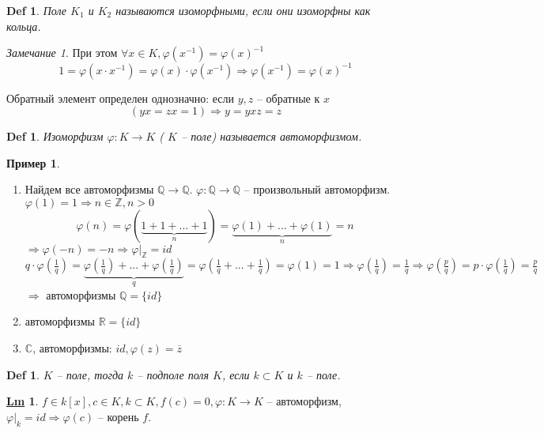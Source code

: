 \documentclass[12pt]{article}
\newenvironment{MyList}[1][4pt]{
  \begin{enumerate}[1.]
  \setlength{\parskip}{0pt}
  \setlength{\itemsep}{#1}
}{       
  \end{enumerate}
}
\def\C{\mathbb{C}}       %
\def\Q{\mathbb{Q}}       %
\def\R{\mathbb{R}}       %
\def\Z{\mathbb{Z}}       %
\def\PHI{\varphi}        %
\def\SO{\Rightarrow}     %
\theoremstyle{definition} %
\newtheorem{Lm}[Thm]{\underline{Lm}} %
\newtheorem{Example}[Thm]{Пример} %
\theoremstyle{plain} %
\newtheorem{Def}[Thm]{Def} %
\theoremstyle{remark} %
\newtheorem{Rem}[Thm]{Замечание} %
\begin{document}
{\begin{Def}
    Поле $K_1$ и $K_2$ называются изоморфными, если они изоморфны как кольца.
\end{Def}

\begin{Rem}
    При этом $\forall x \in K, \PHI(x^{-1}) = \PHI(x)^{-1}$
    $$1 = \PHI(x \cdot x^{-1}) = \PHI(x) \cdot \PHI(x^{-1}) \SO \PHI(x^{-1}) = \PHI(x)^{-1}$$

    Обратный элемент определен однозначно: если $y, z$ -- обратные к $x$ 
    \[(yx = zx = 1) \SO y = yxz = z\]
\end{Rem}

\begin{Def}
    Изоморфизм $\PHI: K \to K$ ( $K$ -- поле) называется автоморфизмом.
\end{Def}

\begin{Example}
    \begin{MyList}
        \item Найдем все автоморфизмы $\Q \to \Q$. $\PHI: \Q \to \Q$ -- произвольный автоморфизм. $\PHI(1) = 1 \SO n \in \Z, n > 0$
        \[\PHI(n) = \PHI(\underbrace{1 + 1 + ... + 1}_n) = \underbrace{\PHI(1) + ... + \PHI(1)}_n = n\]
        $\SO \PHI(-n) = -n \SO\PHI|_\Z = id$ \\
        $q \cdot \PHI \left(\frac{1}{q}\right) = \underbrace{\PHI \left(\frac{1}{q}\right) + ... + \PHI \left(\frac{1}{q}\right)}_q = \PHI\left(\frac{1}{q} + ... + \frac{1}{q}\right) = \PHI(1) = 1 \SO \PHI\left(\frac{1}{q}\right) = \frac{1}{q} \SO \PHI \left(\frac{p}{q}\right) = p \cdot \PHI \left(\frac{1}{q}\right) = \frac{p}{q} $
        $\SO$ автоморфизмы $\Q = \{id\}$    

        \item автоморфизмы $\R = \{id\}$
        \item $\C$, автоморфизмы: $id, \PHI(z) = \overline{z}$   
    \end{MyList}
\end{Example}

\begin{Def}
    $K$ -- поле, тогда $k$ -- подполе поля $K$, если $k \subset K$ и $k$ -- поле.
\end{Def}

\begin{Lm}
    $f \in k[x], c \in K, k \subset K, f(c) = 0, \PHI : K \to K$ -- автоморфизм, $\PHI |_k = id \SO \PHI(c) $ -- корень $f$.
\end{Lm}

}
\end{document}
